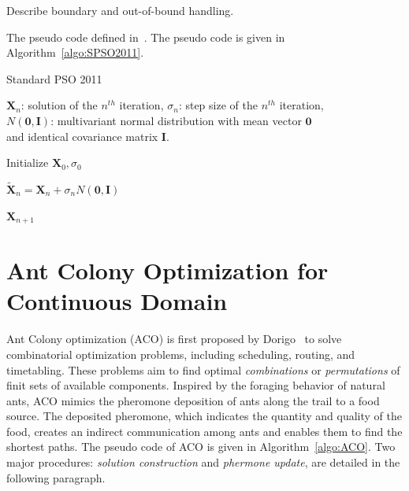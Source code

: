 Describe boundary and out-of-bound handling.



The pseudo code defined in~\cite{Zambrano:2013:SPSO2011}.
The pseudo code is given in Algorithm~\ref{algo:SPSO2011}.



\begin{algorithm}%
\caption{Standard PSO 2011}\label{algo:SPSO2011}

$\boldsymbol{X}_{n}$: solution of the $n^{th}$ iteration, $\sigma_n$: step size of the $n^{th}$ iteration, \\
$N(\boldsymbol{0}, \boldsymbol{I})$: multivariant normal distribution with mean vector $\boldsymbol{0}$ \\ 
and identical covariance matrix $\boldsymbol{I}$.

\BlankLine
{} 

\BlankLine
Initialize $\boldsymbol{X}_0, \sigma_0$ \\
 {

    $\widetilde{\boldsymbol{X}}_n = \boldsymbol{X}_n + \sigma_n N(\boldsymbol{0}, \boldsymbol{I})$  \\

}

\Return $\boldsymbol{X}_{n+1}$

\end{algorithm}




\section{Ant Colony Optimization for Continuous Domain}

Ant Colony optimization (ACO) is first proposed by Dorigo~\cite{Dorigo:1999:ACO} to solve combinatorial optimization problems, including scheduling, routing, and timetabling.
These problems aim to find optimal \textit{combinations} or \textit{permutations} of finit sets of available components.
Inspired by the foraging behavior of natural ants, ACO mimics the pheromone deposition of ants along the trail to a food source.
The deposited pheromone, which indicates the quantity and quality of the food, creates an indirect communication among ants and enables them to find the shortest paths.
The pseudo code of ACO is given in Algorithm~\ref{algo:ACO}.
Two major procedures: \textit{solution construction} and \textit{phermone update}, are detailed in the following paragraph.


